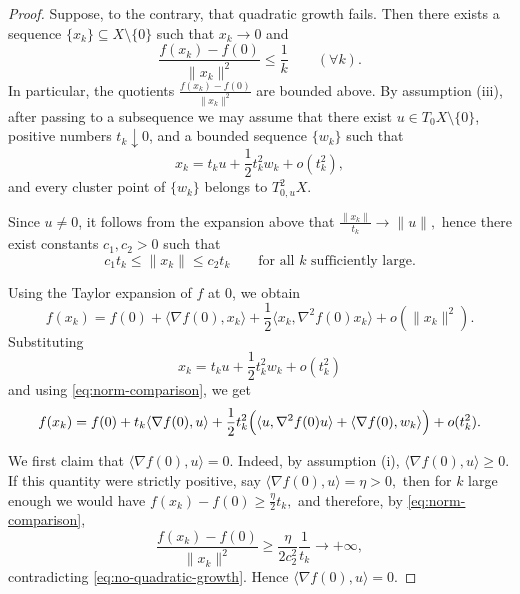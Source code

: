 \documentclass[10pt,a4paper]{amsart}
\begin{document}
\begin{proof}
Suppose, to the contrary, that quadratic growth fails. Then there exists a
sequence $\{x_k\}\subseteq X\setminus\{0\}$ such that $x_k\to 0$ and
\begin{equation}\label{eq:no-quadratic-growth}
\frac{f(x_k)-f(0)}{\|x_k\|^2}\le \frac1k
\qquad (\forall k).
\end{equation}
In particular, the quotients
\(
\frac{f(x_k)-f(0)}{\|x_k\|^2}
\)
are bounded above. By assumption {\rm(iii)}, after passing to a subsequence we
may assume that there exist $u\in T_0X\setminus\{0\}$, positive numbers
$t_k\downarrow 0$, and a bounded sequence $\{w_k\}$ such that
\[
x_k=t_k u+\frac12 t_k^2w_k+o(t_k^2),
\]
and every cluster point of $\{w_k\}$ belongs to $T^2_{0,u}X$.

Since $u\neq 0$, it follows from the expansion above that
\(
\frac{\|x_k\|}{t_k}\to \|u\|,
\)
hence there exist constants $c_1,c_2>0$ such that
\begin{equation}\label{eq:norm-comparison}
c_1 t_k \le \|x_k\| \le c_2 t_k
\qquad \text{for all } k \text{ sufficiently large}.
\end{equation}

Using the Taylor expansion of $f$ at $0$, we obtain
\[
f(x_k)=f(0)
+\langle \nabla f(0),x_k\rangle
+\frac12\langle x_k,\nabla^2 f(0)x_k\rangle
+o(\|x_k\|^2).
\]
Substituting
\[
x_k=t_k u+\frac12 t_k^2w_k+o(t_k^2)
\]
and using \eqref{eq:norm-comparison}, we get
\[
f(x_k)=f(0)
+t_k\langle \nabla f(0),u\rangle
+\frac12 t_k^2
\Bigl(
\langle u,\nabla^2 f(0)u\rangle
+
\langle \nabla f(0),w_k\rangle
\Bigr)
+o(t_k^2).
\]

We first claim that
\(
\langle \nabla f(0),u\rangle =0.
\)
Indeed, by assumption {\rm(i)},
\(
\langle \nabla f(0),u\rangle \ge 0.
\)
If this quantity were strictly positive, say
\(
\langle \nabla f(0),u\rangle =\eta>0,
\)
then for $k$ large enough we would have
\(
f(x_k)-f(0)\ge \frac{\eta}{2}t_k,
\)
and therefore, by \eqref{eq:norm-comparison},
\[
\frac{f(x_k)-f(0)}{\|x_k\|^2}
\ge \frac{\eta}{2c_2^2}\frac{1}{t_k}\to +\infty,
\]
contradicting \eqref{eq:no-quadratic-growth}. Hence
\(
\langle \nabla f(0),u\rangle =0.
\)


\end{proof}
\end{document}
